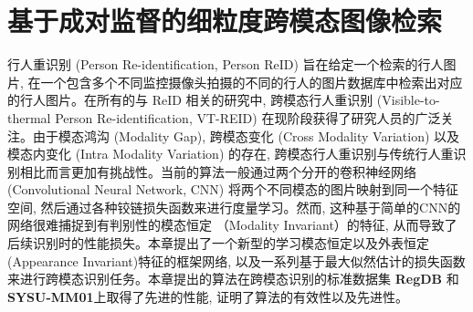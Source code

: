 \chapter{基于成对监督的细粒度跨模态图像检索}
行人重识别 (Person Re-identification, Person ReID) 旨在给定一个检索的行人图片, 在一个包含多个不同监控摄像头拍摄的不同的行人的图片数据库中检索出对应的行人图片。在所有的与 ReID 相关的研究中, 跨模态行人重识别 (Visible-to-thermal Person Re-identification, VT-REID) 在现阶段获得了研究人员的广泛关注。由于模态鸿沟 (Modality Gap), 跨模态变化 (Cross Modality Variation) 以及模态内变化 (Intra Modality Variation) 的存在, 跨模态行人重识别与传统行人重识别相比而言更加有挑战性。当前的算法一般通过两个分开的卷积神经网络 (Convolutional Neural Network, CNN) 将两个不同模态的图片映射到同一个特征空间, 然后通过各种铰链损失函数来进行度量学习。然而, 这种基于简单的CNN的网络很难捕捉到有判别性的模态恒定 （Modality Invariant）的特征, 从而导致了后续识别时的性能损失。本章提出了一个新型的学习模态恒定以及外表恒定 (Appearance Invariant)特征的框架网络, 以及一系列基于最大似然估计的损失函数来进行跨模态识别任务。本章提出的算法在跨模态识别的标准数据集 \textbf{RegDB} 和 \textbf{SYSU-MM01}上取得了先进的性能, 证明了算法的有效性以及先进性。
